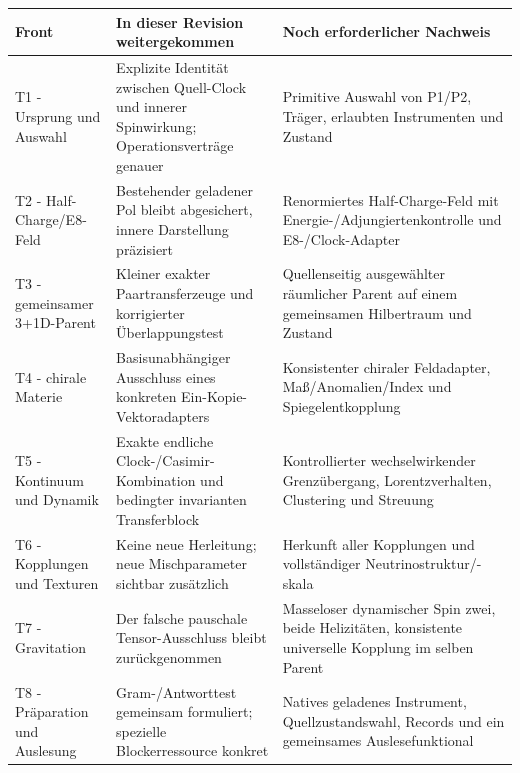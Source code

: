 {\def\LTcaptype{none} %
\begin{longtable}[]{@{}
  >{\raggedright\arraybackslash}p{}
  >{\raggedright\arraybackslash}p{}
  >{\raggedright\arraybackslash}p{}@{}}
\toprule\noalign{}
\begin{minipage}[b]{\linewidth}\raggedright
Front
\end{minipage} & \begin{minipage}[b]{\linewidth}\raggedright
In dieser Revision weitergekommen
\end{minipage} & \begin{minipage}[b]{\linewidth}\raggedright
Noch erforderlicher Nachweis
\end{minipage} \\
\midrule\noalign{}
\endhead
\bottomrule\noalign{}
\endlastfoot
T1 - Ursprung und Auswahl & Explizite Identität zwischen Quell-Clock und
innerer Spinwirkung; Operationsverträge genauer & Primitive Auswahl von
P1/P2, Träger, erlaubten Instrumenten und Zustand \\
T2 - Half-Charge/E8-Feld & Bestehender geladener Pol bleibt abgesichert,
innere Darstellung präzisiert & Renormiertes Half-Charge-Feld mit
Energie-/Adjungiertenkontrolle und E8-/Clock-Adapter \\
T3 - gemeinsamer 3+1D-Parent & Kleiner exakter Paartransferzeuge und
korrigierter Überlappungstest & Quellenseitig ausgewählter räumlicher
Parent auf einem gemeinsamen Hilbertraum und Zustand \\
T4 - chirale Materie & Basisunabhängiger Ausschluss eines konkreten
Ein-Kopie-Vektoradapters & Konsistenter chiraler Feldadapter,
Maß/Anomalien/Index und Spiegelentkopplung \\
T5 - Kontinuum und Dynamik & Exakte endliche Clock-/Casimir-Kombination
und bedingter invarianten Transferblock & Kontrollierter
wechselwirkender Grenzübergang, Lorentzverhalten, Clustering und
Streuung \\
T6 - Kopplungen und Texturen & Keine neue Herleitung; neue
Mischparameter sichtbar zusätzlich & Herkunft aller Kopplungen und
vollständiger Neutrinostruktur/-skala \\
T7 - Gravitation & Der falsche pauschale Tensor-Ausschluss bleibt
zurückgenommen & Masseloser dynamischer Spin zwei, beide Helizitäten,
konsistente universelle Kopplung im selben Parent \\
T8 - Präparation und Auslesung & Gram-/Antworttest gemeinsam formuliert;
spezielle Blockerressource konkret & Natives geladenes Instrument,
Quellzustandswahl, Records und ein gemeinsames Auslesefunktional \\
\end{longtable}
}

